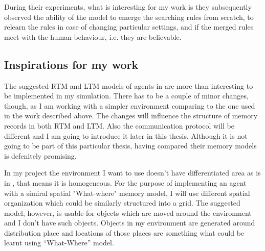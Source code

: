During their experiments, what is interesting for my work is they subsequently observed the ability of the model to emerge the searching rules from scratch, to relearn the rules in case of changing particular settings, and if the merged rules meet with the human behaviour, i.e. they are believable. 
                 
\subsection{Inspirations for my work}

The suggested RTM and LTM models of agents in \cite{Ho:memoryarchitectures} are more than interesting to be implemented in my simulation. There has to be a couple of minor changes, though, as I am working with a simpler environment comparing to the one used in the work described above. The changes will influence the structure of memory records in both RTM and LTM. Also the communication protocol will be different and I am going to introduce it later in this thesis. Although it is not going to be part of this particular thesis, having compared their memory models is defenitely promising.

In my project the environment I want to use doesn’t have differentiated area as is in \cite{Brom:placeandobjects}, that means it is homogeneous. For the purpose of implementing an agent with a simiral spatial "What-where" memory model, I will use different spatial organization which could be similarly structured into a grid.  The suggested model, however, is usable for objects which are moved around the environment and I don’t have such objects. Objects in my environment are generated around distribution place and locations of those places are something what could be learnt using “What-Where” model. 